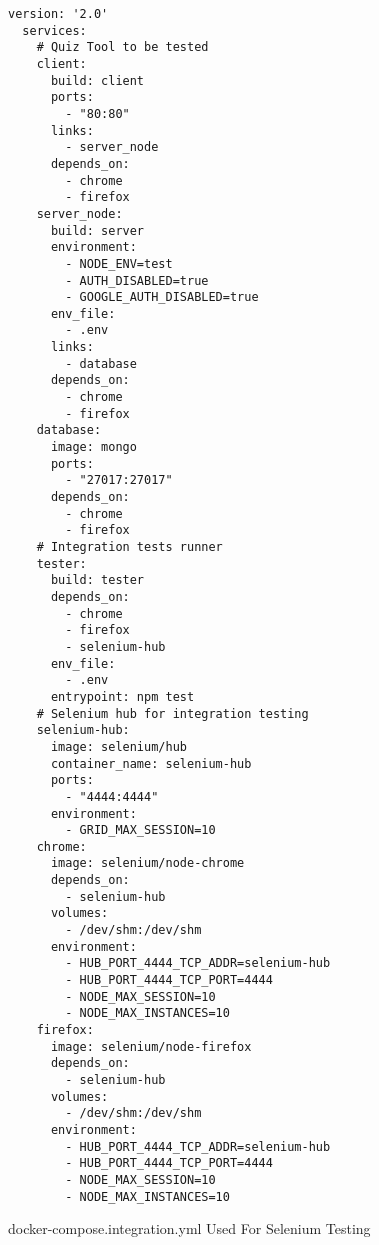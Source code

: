 \begin{figure}[ht]
  \begin{lstlisting}[basicstyle=\tiny, breaklines=true]
  version: '2.0'
  services:
    # Quiz Tool to be tested
    client:
      build: client
      ports:
        - "80:80"
      links:
        - server_node
      depends_on:
        - chrome
        - firefox
    server_node:
      build: server
      environment:
        - NODE_ENV=test
        - AUTH_DISABLED=true
        - GOOGLE_AUTH_DISABLED=true
      env_file:
        - .env
      links:
        - database
      depends_on:
        - chrome
        - firefox
    database:
      image: mongo
      ports:
        - "27017:27017"
      depends_on:
        - chrome
        - firefox
    # Integration tests runner
    tester:
      build: tester
      depends_on:
        - chrome
        - firefox
        - selenium-hub
      env_file:
        - .env
      entrypoint: npm test
    # Selenium hub for integration testing
    selenium-hub:
      image: selenium/hub
      container_name: selenium-hub
      ports:
        - "4444:4444"
      environment:
        - GRID_MAX_SESSION=10
    chrome:
      image: selenium/node-chrome
      depends_on:
        - selenium-hub
      volumes:
        - /dev/shm:/dev/shm
      environment:
        - HUB_PORT_4444_TCP_ADDR=selenium-hub
        - HUB_PORT_4444_TCP_PORT=4444
        - NODE_MAX_SESSION=10
        - NODE_MAX_INSTANCES=10
    firefox:
      image: selenium/node-firefox
      depends_on:
        - selenium-hub
      volumes:
        - /dev/shm:/dev/shm
      environment:
        - HUB_PORT_4444_TCP_ADDR=selenium-hub
        - HUB_PORT_4444_TCP_PORT=4444
        - NODE_MAX_SESSION=10
        - NODE_MAX_INSTANCES=10
  \end{lstlisting}
  \caption{docker-compose.integration.yml Used For Selenium Testing}
  \label{sample:dockercomposeintegration}
\end{figure}
